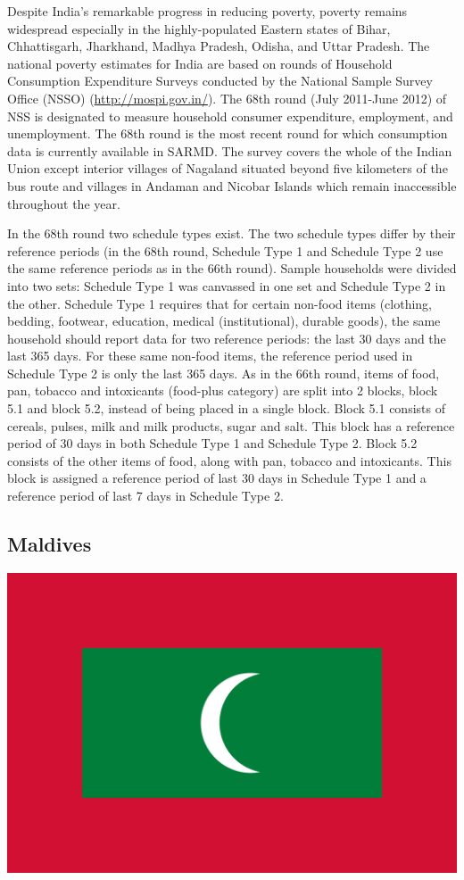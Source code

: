 \documentclass[13 pt,]{book}
\begin{document}
Despite India's remarkable progress in reducing poverty, poverty remains
widespread especially in the highly-populated Eastern states of Bihar,
Chhattisgarh, Jharkhand, Madhya Pradesh, Odisha, and Uttar Pradesh. The
national poverty estimates for India are based on rounds of Household
Consumption Expenditure Surveys conducted by the National Sample Survey
Office (NSSO) (\url{http://mospi.gov.in/}). The 68th round (July
2011-June 2012) of NSS is designated to measure household consumer
expenditure, employment, and unemployment. The 68th round is the most
recent round for which consumption data is currently available in SARMD.
The survey covers the whole of the Indian Union except interior villages
of Nagaland situated beyond five kilometers of the bus route and
villages in Andaman and Nicobar Islands which remain inaccessible
throughout the year.

In the 68th round two schedule types exist. The two schedule types
differ by their reference periods (in the 68th round, Schedule Type 1
and Schedule Type 2 use the same reference periods as in the 66th
round). Sample households were divided into two sets: Schedule Type 1
was canvassed in one set and Schedule Type 2 in the other. Schedule Type
1 requires that for certain non-food items (clothing, bedding, footwear,
education, medical (institutional), durable goods), the same household
should report data for two reference periods: the last 30 days and the
last 365 days. For these same non-food items, the reference period used
in Schedule Type 2 is only the last 365 days. As in the 66th round,
items of food, pan, tobacco and intoxicants (food-plus category) are
split into 2 blocks, block 5.1 and block 5.2, instead of being placed in
a single block. Block 5.1 consists of cereals, pulses, milk and milk
products, sugar and salt. This block has a reference period of 30 days
in both Schedule Type 1 and Schedule Type 2. Block 5.2 consists of the
other items of food, along with pan, tobacco and intoxicants. This block
is assigned a reference period of last 30 days in Schedule Type 1 and a
reference period of last 7 days in Schedule Type 2.

\subsection{Maldives}\label{maldives}

\begin{flushleft}\includegraphics[width=0.4\linewidth]{figures/Flag_of_Maldives} \end{flushleft}
\end{document}
